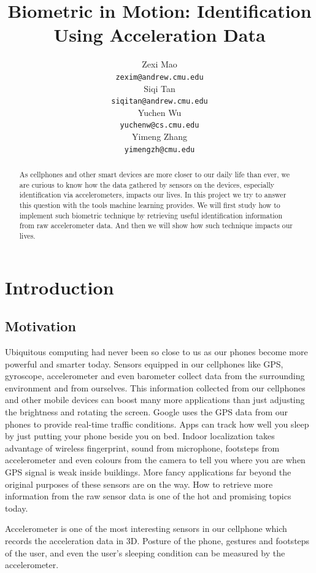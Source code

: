 \documentclass{article} %
\title{Biometric in Motion: Identification Using Acceleration Data}
\author{
Zexi Mao\\
\texttt{zexim@andrew.cmu.edu} \\
\And
Siqi Tan \\
\texttt{siqitan@andrew.cmu.edu} \\
\AND
Yuchen Wu\\
\texttt{yuchenw@cs.cmu.edu} \\
\And
Yimeng Zhang \\
\texttt{yimengzh@cmu.edu} \\
}
\begin{document}
\maketitle

\begin{abstract}
As cellphones and other smart devices are more closer to our daily life than ever, we are curious to know how the data gathered by sensors on the devices, especially identification via accelerometers, impacts our lives. In this project we try to answer this question with the tools machine learning provides. We will first study how to implement such biometric technique by retrieving useful identification information from raw accelerometer data. And then we will show how such technique impacts our lives.
\end{abstract}

\section{Introduction}



\subsection{Motivation}

Ubiquitous computing had never been so close to us as our phones become more powerful and smarter today. Sensors equipped in our cellphones like GPS, gyroscope, accelerometer and even barometer collect data from the surrounding environment and from ourselves. This information collected from our cellphones and other mobile devices can boost many more applications than just adjusting the brightness and rotating the screen. Google uses the GPS data from our phones to provide real-time traffic conditions. Apps can track how well you sleep by just putting your phone beside you on bed. Indoor localization takes advantage of wireless fingerprint, sound from microphone, footsteps from accelerometer and even colours from the camera to tell you where you are when GPS signal is weak inside buildings. More fancy applications far beyond the original purposes of these sensors are on the way. How to retrieve more information from the raw sensor data is one of the hot and promising topics today.

Accelerometer is one of the most interesting sensors in our cellphone which records the acceleration data in 3D. Posture of the phone, gestures and footsteps of the user, and even the user's sleeping condition can be measured by the accelerometer.
\end{document}
